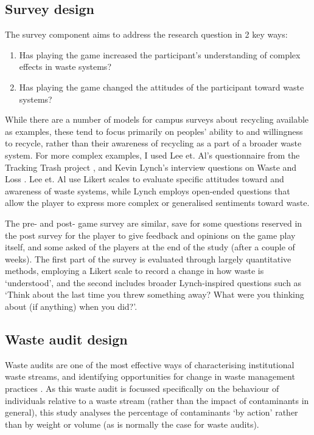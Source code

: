 \documentclass[nofonts,nols,justified,nobib]{tufte-book}
\begin{document}
\subsection*{Survey design}

The survey component aims to address the research question in 2 key ways:

\begin{enumerate}
\item Has playing the game increased the participant's understanding of complex effects in waste systems?
\item Has playing the game changed the attitudes of the participant toward waste systems?
\end{enumerate}

While there are a number of models for campus surveys about recycling available as examples, these tend to focus primarily on peoples' ability to and willingness to recycle, rather than their awareness of recycling as a part of a broader waste system. For more complex examples, I used Lee et. Al's questionnaire from the Tracking Trash project \cite{lee_learning_2014}, and Kevin Lynch's interview questions on Waste and Loss \cite{lynch_wasting_1990}. Lee et. Al use Likert scales to evaluate specific attitudes toward and awareness of waste systems, while Lynch employs open-ended questions that allow the player to express more complex or generalised sentiments toward waste.


The pre- and post- game survey are similar, save for some questions reserved in the post survey for the player to give feedback and opinions on the game play itself, and some asked of the players at the end of the study (after a couple of weeks). The first part of the survey is evaluated through largely quantitative methods, employing a Likert scale to record a change in how waste is `understood', and the second includes broader Lynch-inspired questions such as `Think about the last time you threw something away? What were you thinking about (if anything) when you did?'. 


\subsection*{Waste audit design}
Waste audits are one of the most effective ways of characterising institutional waste streams, and identifying opportunities for change in waste management practices \cite{smyth_reducing_2010}. As this waste audit is focussed specifically on the behaviour of individuals relative to a waste stream (rather than the impact of contaminants in general), this study analyses the percentage of contaminants `by action' rather than by weight or volume (as is normally the case for waste audits).
\end{document}
